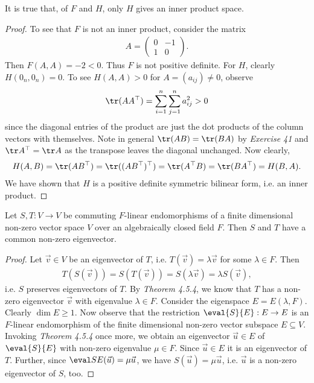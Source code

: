 \documentclass{article}
\begin{document}
\begin{claim*}[1c]
	It is true that, of $F$ and $H$, only $H$ gives an inner product space.
	\begin{proof}
		To see that $F$ is not an inner product, consider the matrix 
		\begin{align*}
			A=\begin{pmatrix}
				0 &-1 \\ 
				1 & 0
			\end{pmatrix}.
		\end{align*}
		Then $F(A,A)=-2<0$. Thus $F$ is not positive definite. For $H$, clearly 
		$H(0_n,0_n)=0$. To see $H(A,A)>0$ for $A=(a_{ij})\not=0$, observe
		\begin{align*}
			\tr(AA^\top) = \sum_{i=1}^n \sum_{j=1}^n a_{ij}^2 > 0
		\end{align*} 
		since the diagonal entries of the product are just the dot products of the column 
		vectors with themselves. Note in general $\tr(AB)=\tr(BA)$ by \emph{Exercise 41} 
		and $\tr A^\top=\tr A$ as the transpose leaves the diagonal unchanged. Now clearly, 
		\begin{align*}
			H(A,B) = \tr(AB^\top) = \tr((AB^\top)^\top)  = \tr(A^\top B) = \tr(BA^\top) = H(B,A).
		\end{align*} 
		We have shown that $H$ is a positive definite symmetric bilinear form, i.e. an inner 
		product.
	\end{proof}
\end{claim*}

\begin{claim*}[2]
	Let $S,T:V\to V$ be commuting $F$-linear endomorphisms of a finite dimensional non-zero vector space $V$ over an
	algebraically closed field $F$. Then $S$ and $T$ have a common non-zero eigenvector.
	\begin{proof}
		Let $\vec v\in V$ be an eigenvector of $T$, i.e. $T(\vec v) = \lambda \vec v$ for some $\lambda\in F$.
		Then 
		\begin{align*}
			T(S(\vec v)) = S(T(\vec v)) = S(\lambda\vec v) = \lambda S(\vec v),
		\end{align*}
		i.e. $S$ preserves eigenvectors of $T$. By \emph{Theorem 4.5.4}, we know that $T$ has
		a non-zero eigenvector $\vec v$ with eigenvalue $\lambda\in F$. Consider the eigenspace 
		$E=E(\lambda, F)$. Clearly $\dim E \geq 1$. Now observe that the restriction 
		$\eval{S}{E}:E\to E$ is an $F$-linear endomorphism of the finite dimensional non-zero vector subspace $E\subseteq V$.
		Invoking \emph{Theorem 4.5.4} once more, we obtain an eigenvector $\vec u\in E$ of $\eval{S}{E}$ 
		with non-zero eigenvalue $\mu\in F$.
		Since $\vec u\in E$ it is an eigenvector of $T$. Further, since $\eval SE(\vec u) = \mu\vec u$, 
		we have $S(\vec u)=\mu \vec u$, i.e. $\vec u$ is a non-zero eigenvector of $S$, too.
	\end{proof}
\end{claim*}
\end{document}

